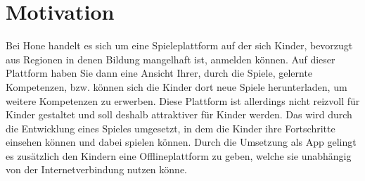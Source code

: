 \chapter{Motivation}
Bei Hone handelt es sich um eine Spieleplattform auf der sich Kinder, bevorzugt aus Regionen in denen Bildung mangelhaft ist, anmelden können. Auf dieser Plattform haben Sie dann eine Ansicht Ihrer, durch die Spiele, gelernte Kompetenzen, bzw. können sich die Kinder dort neue Spiele herunterladen, um weitere Kompetenzen zu erwerben. Diese Plattform ist allerdings nicht reizvoll für Kinder gestaltet und soll deshalb attraktiver für Kinder werden. Das wird durch die Entwicklung eines Spieles umgesetzt, in dem die Kinder ihre Fortschritte einsehen können und dabei spielen können. Durch die Umsetzung als App gelingt es zusätzlich den Kindern eine Offlineplattform zu geben, welche sie unabhängig von der Internetverbindung nutzen könne. 